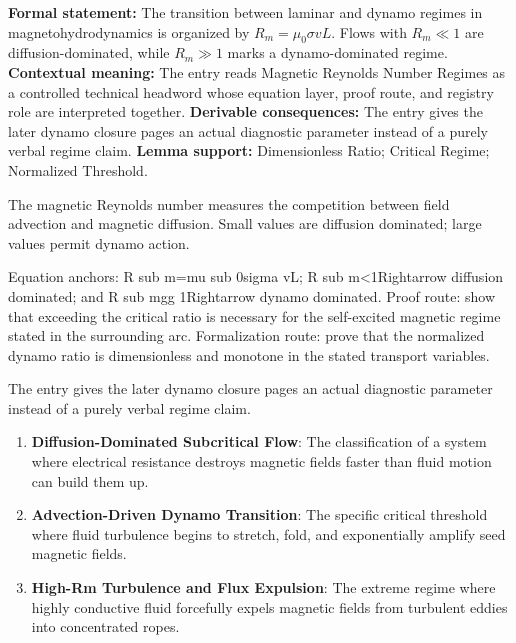 \begingroup\footnotesize\setlength{\emergencystretch}{3em}\sloppy
\textbf{Formal statement:} The transition between laminar and dynamo regimes in magnetohydrodynamics is organized by \(R_m=\mu_0\sigma vL\). Flows with \(R_m\ll1\) are diffusion-dominated, while \(R_m\gg1\) marks a dynamo-dominated regime. \textbf{Contextual meaning:} The entry reads Magnetic Reynolds Number Regimes as a controlled technical headword whose equation layer, proof route, and registry role are interpreted together. \textbf{Derivable consequences:} The entry gives the later dynamo closure pages an actual diagnostic parameter instead of a purely verbal regime claim. \textbf{Lemma support:} Dimensionless Ratio; Critical Regime; Normalized Threshold.\par
\endgroup

The magnetic Reynolds number measures the competition between field advection and magnetic diffusion. Small values are diffusion dominated; large values permit dynamo action.

Equation anchors: R sub m=mu sub 0sigma vL; R sub m<1Rightarrow diffusion dominated; and R sub mgg 1Rightarrow dynamo dominated. Proof route: show that exceeding the critical ratio is necessary for the self-excited magnetic regime stated in the surrounding arc. Formalization route: prove that the normalized dynamo ratio is dimensionless and monotone in the stated transport variables.

The entry gives the later dynamo closure pages an actual diagnostic parameter instead of a purely verbal regime claim.
\endgroup

\begin{enumerate}[leftmargin=1.6em,itemsep=6pt,topsep=4pt]
\item \textbf{Diffusion-Dominated Subcritical Flow}: The classification of a system where electrical resistance destroys magnetic fields faster than fluid motion can build them up.
\item \textbf{Advection-Driven Dynamo Transition}: The specific critical threshold where fluid turbulence begins to stretch, fold, and exponentially amplify seed magnetic fields.
\item \textbf{High-Rm Turbulence and Flux Expulsion}: The extreme regime where highly conductive fluid forcefully expels magnetic fields from turbulent eddies into concentrated ropes.
\end{enumerate}

